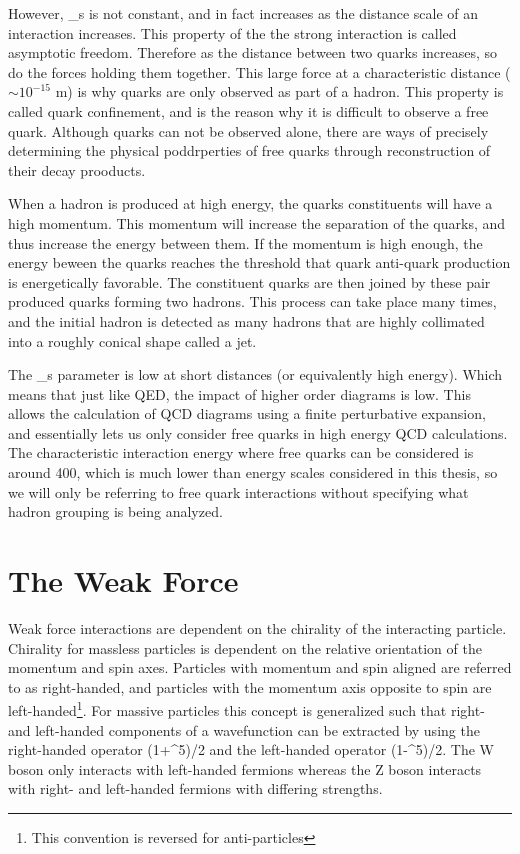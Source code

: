However, \alpha_s is not constant, and in fact increases as the distance scale of an interaction increases.  
This property of the the strong interaction is called asymptotic freedom.  
Therefore as the distance between two quarks increases, so do the forces holding them together.  
This large force at a characteristic distance ($\sim10^{-15}$ m) is why quarks are only observed as part of a hadron.    
This property is called quark confinement, and is the reason why it is difficult to observe a free quark.  
Although quarks can not be observed alone, there are ways of precisely determining the physical poddrperties of free quarks through reconstruction of their decay prooducts.  

When a hadron is produced at high energy, the quarks constituents will have a high momentum.  
This momentum will increase the separation of the quarks, and thus increase the energy between them.  
If the momentum is high enough, the energy beween the quarks reaches the threshold that quark anti-quark production is energetically favorable.  
The constituent quarks are then joined by these pair produced quarks forming two hadrons.  
This process can take place many times, and the initial hadron is detected as many hadrons that are highly collimated into a roughly conical shape called a jet.

The \alpha_s parameter is low at short distances (or equivalently high energy).  
Which means that just like QED, the impact of higher order diagrams is low.  
This allows the calculation of QCD diagrams using a finite perturbative expansion, and essentially lets us only consider free quarks in high energy QCD calculations. 
The characteristic interaction energy where free quarks can be considered is around 400\MeVcc, which is much lower than energy scales 
considered in this thesis, so we will only be referring to free quark interactions without specifying what hadron grouping is being analyzed.  

\section{The Weak Force}
Weak force interactions are dependent on the chirality of the interacting particle.
Chirality for massless particles is dependent on the relative orientation of the momentum and spin axes.  
Particles with momentum and spin aligned are referred to as right-handed, and particles with the momentum 
axis opposite to spin are left-handed\footnote{This convention is reversed for anti-particles}.
For massive particles this concept is generalized such that right- and left-handed components of a wavefunction 
can be extracted by using the right-handed operator (1+\gamma^5)/2 and the left-handed operator (1-\gamma^5)/2.  
The W boson only interacts with left-handed fermions whereas the Z boson interacts with right- and left-handed fermions with differing strengths. 

